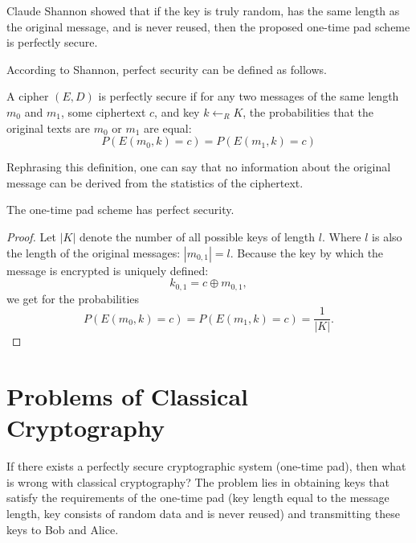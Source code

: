 Claude Shannon showed \cite{bShenonCrypto} that if the key is truly random, has the same length as the original message, and is never reused, then the proposed one-time pad scheme is perfectly secure.

According to Shannon, perfect security can be defined as follows.
\begin{definition}
A cipher $(E,D)$ is perfectly secure if for any two messages of the same length $m_0$ and $m_1$, some ciphertext $c$, and key $k \leftarrow_R K$, the probabilities that the original texts are $m_0$ or $m_1$ are equal:
\begin{equation}
P\left(E\left(m_0, k\right) = c \right) = 
P\left(E\left(m_1, k\right) = c \right)
\nonumber
\end{equation}
\end{definition}
Rephrasing this definition, one can say that no information about the original message can be derived from the statistics of the ciphertext.

\begin{theorem}
The one-time pad scheme has perfect security.
\end{theorem}

\begin{proof}
Let $\left|K\right|$ denote the number of all possible keys of length $l$. Where $l$ is also the length of the original messages: $\left|m_{0,1}\right| = l$. Because the key by which the message is encrypted is uniquely defined:
\begin{equation}
k_{0,1} = c \oplus m_{0,1},
\nonumber
\end{equation} 
we get for the probabilities
\begin{equation}
P\left(E\left(m_0, k\right) = c \right) = 
P\left(E\left(m_1, k\right) = c \right) = 
\frac{1}{\left|K\right|}.
\nonumber
\end{equation}
\end{proof}

\section{Problems of Classical Cryptography}

If there exists a perfectly secure cryptographic system (one-time pad), then what is wrong with classical cryptography? The problem lies in obtaining keys that satisfy the requirements of the one-time pad (key length equal to the message length, key consists of random data and is never reused) and transmitting these keys to Bob and Alice.

